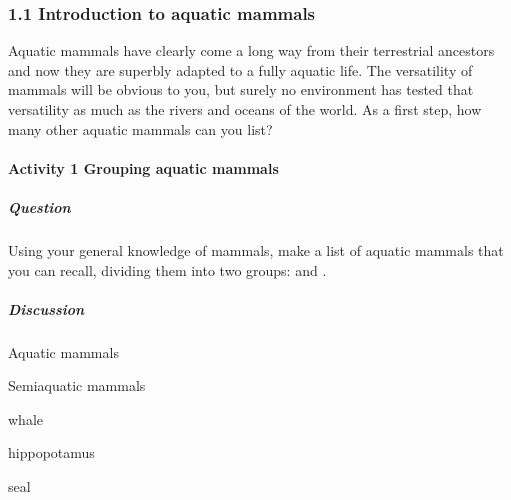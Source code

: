 \documentclass[letterpaper,10pt,english]{sphinxmanual}
\begin{document}
\subsubsection{1.1 Introduction to aquatic mammals}
\label{\detokenize{content/session_00/Part_00_01:1.1-Introduction-to-aquatic-mammals}}
Aquatic mammals have clearly come a long way from their terrestrial ancestors and now they are superbly adapted to a fully aquatic life. The versatility of mammals will be obvious to you, but surely no environment has tested that versatility as much as the rivers and oceans of the world. As a first step, how many other aquatic mammals can you list?


\paragraph{Activity 1 Grouping aquatic mammals}
\label{\detokenize{content/session_00/Part_00_01:Activity-1-Grouping-aquatic-mammals}}


\subparagraph{Question}
\label{\detokenize{content/session_00/Part_00_01:Question}}
Using your general knowledge of mammals, make a list of aquatic mammals that you can recall, dividing them into two groups:  and .


\subparagraph{Discussion}
\label{\detokenize{content/session_00/Part_00_01:Discussion}}












Aquatic mammals





Semi\sphinxhyphen{}aquatic mammals









whale





hippopotamus









seal
\end{document}

